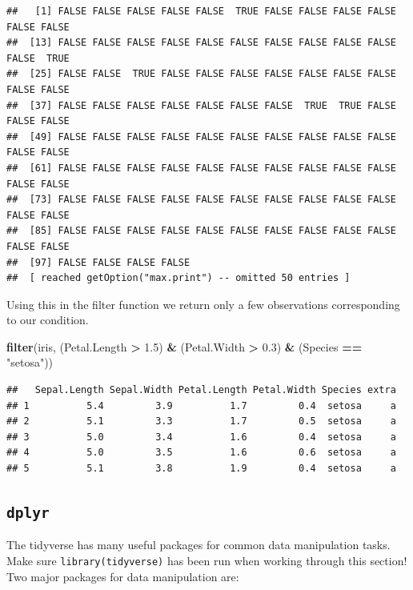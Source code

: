 \documentclass[
]{book}
\newenvironment{Shaded}{\begin{snugshade}}{\end{snugshade}}
\newcommand{\FloatTok}[1]{\textcolor[rgb]{0.00,0.00,0.81}{#1}}
\newcommand{\KeywordTok}[1]{\textcolor[rgb]{0.13,0.29,0.53}{\textbf{#1}}}
\newcommand{\NormalTok}[1]{#1}
\newcommand{\OperatorTok}[1]{\textcolor[rgb]{0.81,0.36,0.00}{\textbf{#1}}}
\newcommand{\StringTok}[1]{\textcolor[rgb]{0.31,0.60,0.02}{#1}}
\theoremstyle{definition}
\theoremstyle{definition}
\theoremstyle{definition}
\theoremstyle{remark}
\begin{document}
\begin{verbatim}
##   [1] FALSE FALSE FALSE FALSE FALSE  TRUE FALSE FALSE FALSE FALSE FALSE FALSE
##  [13] FALSE FALSE FALSE FALSE FALSE FALSE FALSE FALSE FALSE FALSE FALSE  TRUE
##  [25] FALSE FALSE  TRUE FALSE FALSE FALSE FALSE FALSE FALSE FALSE FALSE FALSE
##  [37] FALSE FALSE FALSE FALSE FALSE FALSE FALSE  TRUE  TRUE FALSE FALSE FALSE
##  [49] FALSE FALSE FALSE FALSE FALSE FALSE FALSE FALSE FALSE FALSE FALSE FALSE
##  [61] FALSE FALSE FALSE FALSE FALSE FALSE FALSE FALSE FALSE FALSE FALSE FALSE
##  [73] FALSE FALSE FALSE FALSE FALSE FALSE FALSE FALSE FALSE FALSE FALSE FALSE
##  [85] FALSE FALSE FALSE FALSE FALSE FALSE FALSE FALSE FALSE FALSE FALSE FALSE
##  [97] FALSE FALSE FALSE FALSE
##  [ reached getOption("max.print") -- omitted 50 entries ]
\end{verbatim}

Using this in the filter function we return only a few observations corresponding to our condition.

\begin{Shaded}
\begin{Highlighting}[]
\KeywordTok{filter}\NormalTok{(iris, (Petal.Length }\OperatorTok{>}\StringTok{ }\FloatTok{1.5}\NormalTok{) }\OperatorTok{&}\StringTok{ }\NormalTok{(Petal.Width }\OperatorTok{>}\StringTok{ }\FloatTok{0.3}\NormalTok{) }\OperatorTok{&}\StringTok{ }
\StringTok{         }\NormalTok{(Species }\OperatorTok{==}\StringTok{ "setosa"}\NormalTok{))}
\end{Highlighting}
\end{Shaded}

\begin{verbatim}
##   Sepal.Length Sepal.Width Petal.Length Petal.Width Species extra
## 1          5.4         3.9          1.7         0.4  setosa     a
## 2          5.1         3.3          1.7         0.5  setosa     a
## 3          5.0         3.4          1.6         0.4  setosa     a
## 4          5.0         3.5          1.6         0.6  setosa     a
## 5          5.1         3.8          1.9         0.4  setosa     a
\end{verbatim}

\hypertarget{dplyr-1}{%
\subsection{\texorpdfstring{\texttt{dplyr}}{dplyr}}\label{dplyr-1}}

The tidyverse has many useful packages for common data manipulation tasks. Make sure \texttt{library(tidyverse)} has been run when working through this section!\\
Two major packages for data manipulation are:
\end{document}
